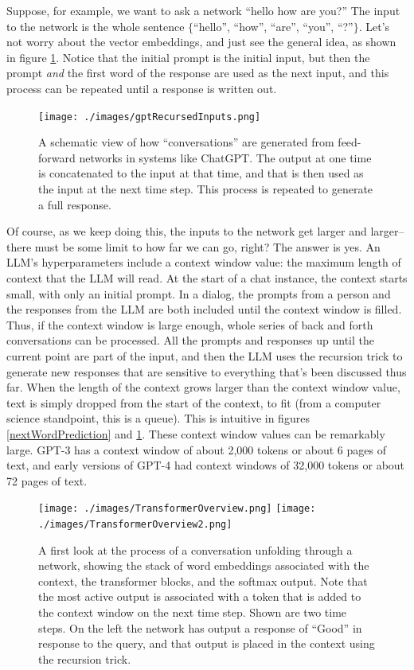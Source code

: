Suppose, for example, we want to ask a network ``hello how are you?'' The input
to the network is the whole sentence $\{$``hello'', ``how'', ``are'', ``you'',
``?''$\}$. Let's  not worry about the vector embeddings, and just see the
general idea, as shown in figure \ref{gptRecursedInputs}. Notice that the
initial prompt is the initial input, but then the prompt \emph{and} the first
word of the response are used as the next input, and this process can be
repeated until a response is written out.
  
\begin{figure}[ht]
\centering
\texttt{[image: ./images/gptRecursedInputs.png]}
\caption[Jeff Yoshimi]{A schematic view of how ``conversations'' are generated
from feed-forward networks in systems like ChatGPT. The output at one time is
concatenated to the input at that time, and that is then used as the input at
the next time step. This process is repeated to generate a full response.
}
\label{gptRecursedInputs}
\end{figure}

Of course, as we keep doing this, the inputs to the network get larger and
larger--there must be some limit to how far we can go, right? The answer is
yes. An LLM's hyperparameters include a context window value: the
maximum length of context that the LLM will read. At the start of a chat
instance, the context starts small, with only an initial prompt. In a dialog,
the prompts from a person and the responses from the LLM are both included
until the context window is filled. Thus, if the context window is large
enough, whole series of back and forth conversations can be processed. All the
prompts and responses up until the current point are part of the input, and
then the LLM uses the recursion trick to generate new responses that are
sensitive to everything that's been discussed thus far. When the length of the
context grows larger than the context window value, text is simply dropped from
the start of the context, to fit (from a computer science standpoint, this is a
queue). This is intuitive in figures \ref{nextWordPrediction} and
\ref{gptRecursedInputs}. These context window values can be remarkably large.
GPT-3 has a context window of about 2,000 tokens or about 6 pages of text, and
early versions of GPT-4 had context windows of 32,000 tokens or about 72 pages
of text.

\begin{figure}[ht]
\centering
\texttt{[image: ./images/TransformerOverview.png]} \; \; \; 
\texttt{[image: ./images/TransformerOverview2.png]}
\caption[Jeff Yoshimi]{A first look at the process of a conversation unfolding
through a network, showing the stack of word embeddings associated with the
context, the transformer blocks, and the softmax output. Note that the
most active output is associated with a token that is added to the context
window on the next time step. Shown are two time steps. On the left the network
has output a response of ``Good'' in response to the query, and that output is
placed in the context using the recursion trick.
}
\label{transformerOverview}
\end{figure}

